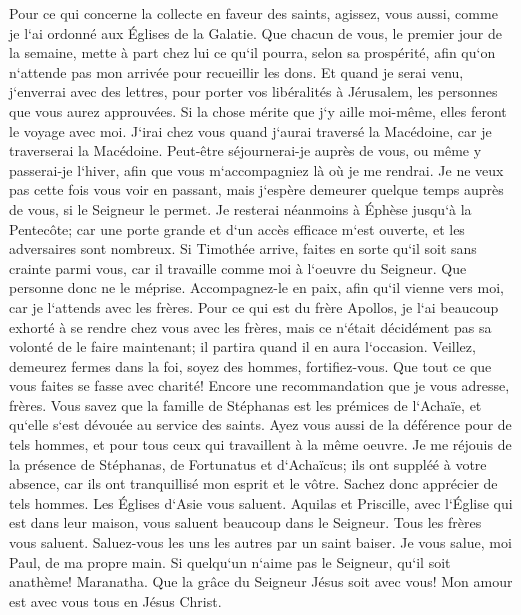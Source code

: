 \verse Pour ce qui concerne la collecte en faveur des saints, agissez, vous aussi, comme je l`ai ordonné aux Églises de la Galatie. 
\verse Que chacun de vous, le premier jour de la semaine, mette à part chez lui ce qu`il pourra, selon sa prospérité, afin qu`on n`attende pas mon arrivée pour recueillir les dons. 
\verse Et quand je serai venu, j`enverrai avec des lettres, pour porter vos libéralités à Jérusalem, les personnes que vous aurez approuvées. 
\verse Si la chose mérite que j`y aille moi-même, elles feront le voyage avec moi. 
\verse J`irai chez vous quand j`aurai traversé la Macédoine, car je traverserai la Macédoine. 
\verse Peut-être séjournerai-je auprès de vous, ou même y passerai-je l`hiver, afin que vous m`accompagniez là où je me rendrai. 
\verse Je ne veux pas cette fois vous voir en passant, mais j`espère demeurer quelque temps auprès de vous, si le Seigneur le permet. 
\verse Je resterai néanmoins à Éphèse jusqu`à la Pentecôte; 
\verse car une porte grande et d`un accès efficace m`est ouverte, et les adversaires sont nombreux. 
\verse Si Timothée arrive, faites en sorte qu`il soit sans crainte parmi vous, car il travaille comme moi à l`oeuvre du Seigneur. 
\verse Que personne donc ne le méprise. Accompagnez-le en paix, afin qu`il vienne vers moi, car je l`attends avec les frères. 
\verse Pour ce qui est du frère Apollos, je l`ai beaucoup exhorté à se rendre chez vous avec les frères, mais ce n`était décidément pas sa volonté de le faire maintenant; il partira quand il en aura l`occasion. 
\verse Veillez, demeurez fermes dans la foi, soyez des hommes, fortifiez-vous. 
\verse Que tout ce que vous faites se fasse avec charité! 
\verse Encore une recommandation que je vous adresse, frères. Vous savez que la famille de Stéphanas est les prémices de l`Achaïe, et qu`elle s`est dévouée au service des saints. 
\verse Ayez vous aussi de la déférence pour de tels hommes, et pour tous ceux qui travaillent à la même oeuvre. 
\verse Je me réjouis de la présence de Stéphanas, de Fortunatus et d`Achaïcus; ils ont suppléé à votre absence, 
\verse car ils ont tranquillisé mon esprit et le vôtre. Sachez donc apprécier de tels hommes. 
\verse Les Églises d`Asie vous saluent. Aquilas et Priscille, avec l`Église qui est dans leur maison, vous saluent beaucoup dans le Seigneur. 
\verse Tous les frères vous saluent. Saluez-vous les uns les autres par un saint baiser. 
\verse Je vous salue, moi Paul, de ma propre main. 
\verse Si quelqu`un n`aime pas le Seigneur, qu`il soit anathème! Maranatha. 
\verse Que la grâce du Seigneur Jésus soit avec vous! 
\verse Mon amour est avec vous tous en Jésus Christ. 
